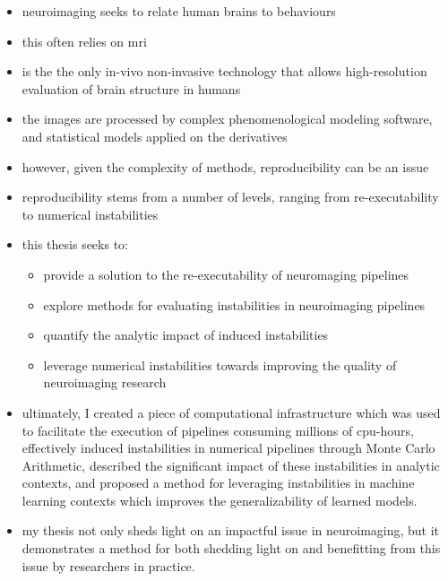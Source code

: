 \begin{itemize}
\item neuroimaging seeks to relate human brains to behaviours
\item this often relies on mri
\item is the the only in-vivo non-invasive technology that allows high-resolution evaluation of brain structure in humans
\item the images are processed by complex phenomenological modeling software, and statistical models applied on the derivatives
\item however, given the complexity of methods, reproducibility can be an issue
\item reproducibility stems from a number of levels, ranging from re-executability to numerical instabilities
\item this thesis seeks to:
\begin{itemize}
\item provide a solution to the re-executability of neuromaging pipelines
\item explore methods for evaluating instabilities in neuroimaging pipelines
\item quantify the analytic impact of induced instabilities
\item leverage numerical instabilities towards improving the quality of neuroimaging research
\end{itemize}
\item ultimately, I created a piece of computational infrastructure which was used to facilitate the execution of pipelines consuming millions of cpu-hours, effectively induced instabilities in numerical pipelines through Monte Carlo Arithmetic, described the significant impact of these instabilities in analytic contexts, and proposed a method for leveraging instabilities in machine learning contexts which improves the generalizability of learned models.
\item my thesis not only sheds light on an impactful issue in neuroimaging, but it demonstrates a method for both shedding light on and benefitting from this issue by researchers in practice.
\end{itemize}
